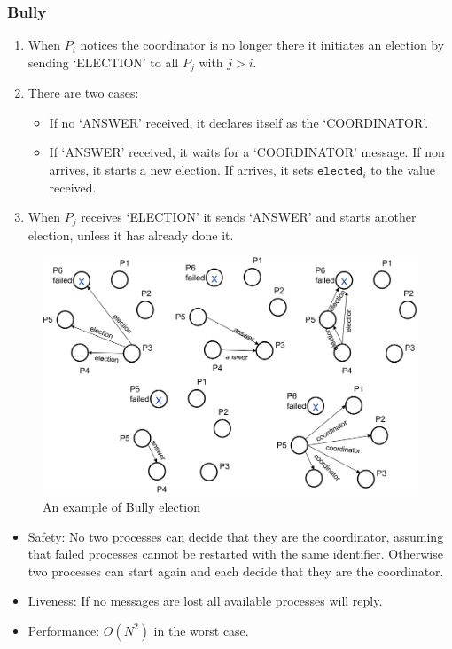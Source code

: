 \documentclass[twocolumn,landscape,10pt]{article}
\theoremstyle{definition}
\begin{document}
\subsubsection{Bully}


\begin{enumerate}
    \item When $P_i$ notices the coordinator is no longer there it initiates an
        election by sending `ELECTION' to all $P_j$ with $j>i$.
    \item There are two cases:
        \begin{itemize}
            \item If no `ANSWER' received, it declares itself as the
                `COORDINATOR'.
            \item If `ANSWER' received, it waits for a `COORDINATOR' message. If
                non arrives, it starts a new election. If arrives, it sets
                $\texttt{elected}_i$ to the value received.
        \end{itemize} 
    \item When $P_j$ receives `ELECTION' it sends `ANSWER' and starts another
        election, unless it has already done it.
\end{enumerate} 

\begin{figure}
  	\includegraphics[scale=0.30]{bully.png}
  	\centering
  	\caption{An example of Bully election}
\end{figure}


\begin{itemize}
    \item Safety: No two processes can decide that they are the coordinator,
        assuming that failed processes cannot be restarted with the same
        identifier. Otherwise two processes can start again and each decide that
        they are the coordinator.
    \item Liveness: If no messages are lost all available processes will reply.
    \item Performance: $O(N^2)$ in the worst case.
\end{itemize} 
\end{document}
